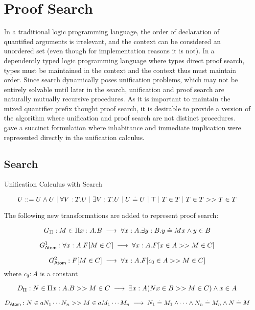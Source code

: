 \section{Proof Search}

In a traditional logic programming language, the order of declaration of quantified arguments is irrelevant, 
and the context can be considered an unordered set (even though for implementation reasons it is not). 
In a dependently typed logic programming language where types direct proof search, types must be maintained in the context
and the context thus must maintain order.   Since search dynamically poses unification problems, which may not be 
entirely solvable until later in the search, unification and proof search are naturally mutually recursive procedures.
As it is important to maintain the mixed quantifier prefix thought proof search, it is desirable to provide a version 
of the algorithm where unification and proof search are not distinct procedures. 
\citep{pfenning1991logic} gave a succinct formulation where inhabitance and immediate implication were represented
directly in the unification calculus.  

\subsection{Search}

\begin{definition}
Unification Calculus with Search

\[
U ::= U \wedge U 
 \; | \; \forall V : T . U
 \; | \; \exists V : T . U 
 \; | \; U \doteq U
 \; | \; \top
  \; | \; T \in T 
  \; | \; T \in T >> T \in T
\]

\end{definition}

The following new transformations are added to represent proof search:

\[
G_\Pi : M \in \Pi x : A . B   \;\longrightarrow\; \forall x : A . \exists y : B . y \doteq M x \wedge y \in B
\]

\[
G^1_{\mathsf{Atom}} : \forall x : A . F[M\in C]  \;\longrightarrow\; \forall x : A . F[x \in A >> M \in C]
\]

\[
G^2_{\mathsf{Atom}} : F[M\in C]  \;\longrightarrow\; \forall x : A . F[c_0 \in A >> M \in C]
\]  where $c_0 : A$ is a constant

\[
D_\Pi : N\in \Pi x : A . B >> M \in C \;\longrightarrow\; \exists x : A ( N x \in B >> M \in C) \wedge x \in A
\]

\[
D_{\mathsf{Atom}} : N\in a N_1 \cdots N_n >> M \in a M_1 \cdots M_n \;\longrightarrow\; N_1 \doteq M_1 \wedge \cdots \wedge N_n \doteq M_n \wedge N \doteq M
\]

